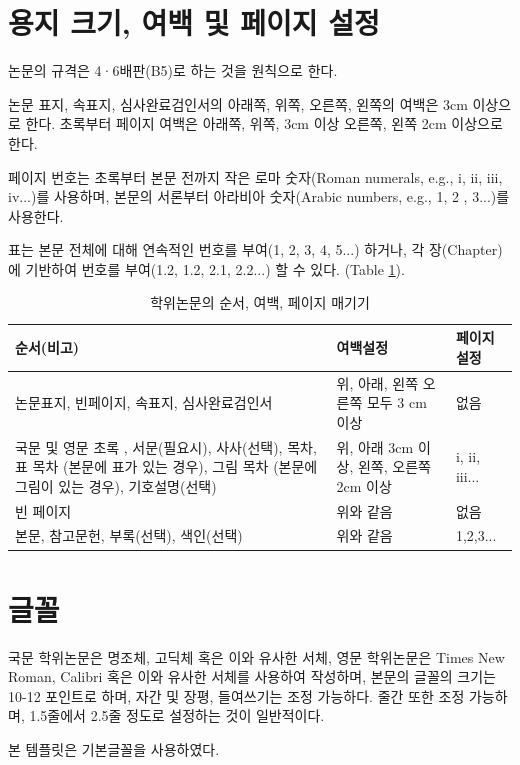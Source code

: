\documentclass[11pt]{report}
\numberwithin{figure}{chapter}
\begin{document}
\section{용지 크기, 여백 및 페이지 설정} \label{sec:papersize}
논문의 규격은 4·6배판(B5)로 하는 것을 원칙으로 한다.

논문 표지, 속표지, 심사완료검인서의 아래쪽, 위쪽, 오른쪽, 왼쪽의 여백은 3cm 이상으로 한다. 초록부터 페이지 여백은 아래쪽, 위쪽, 3cm 이상 오른쪽, 왼쪽 2cm 이상으로 한다.

페이지 번호는 초록부터 본문 전까지 작은 로마 숫자(Roman numerals, e.g., i, ii, iii, iv...)를 사용하며, 본문의 서론부터 아라비아 숫자(Arabic numbers, e.g., 1, 2 , 3...)를 사용한다.

표는 본문 전체에 대해 연속적인 번호를 부여(1, 2, 3, 4, 5...) 하거나, 각 장(Chapter)에 기반하여 번호를 부여(1.2, 1.2, 2.1, 2.2...) 할 수 있다. (Table \ref{tab:Organizing and formatting}).

\renewcommand\tablename{표}
\begin{table}
\caption{학위논문의 순서, 여백, 페이지 매기기}
\label{tab:Organizing and formatting}
\vspace{0.5cm}
\begin{tabular}{ m{7cm} m{3cm} m{2cm}}
\hline
순서(비고) & 여백설정& 페이지설정\\\hline
논문표지, 빈페이지, 속표지, 심사완료검인서  &	 위, 아래, 왼쪽 오른쪽 모두 3 cm 이상	&	없음\\\hline
국문 및 영문 초록 , 서문(필요시), 사사(선택), 목차, 표 목차 (본문에 표가 있는 경우), 그림 목차 (본문에 그림이 있는 경우), 기호설명(선택)	& 위, 아래 3cm 이상, 왼쪽, 오른쪽 2cm 이상  &  i, ii, iii...         \\\hline		
빈 페이지 & 위와 같음 & 없음\\\hline
본문, 참고문헌, 부록(선택), 색인(선택) & 위와 같음 & 1,2,3...	\\\hline

\end{tabular}
\end{table}

\section{글꼴} \label{sec:font}
국문 학위논문은 명조체, 고딕체 혹은 이와 유사한 서체, 영문 학위논문은 Times New Roman, Calibri 혹은 이와 유사한 서체를 사용하여 작성하며, 본문의 글꼴의 크기는 10-12 포인트로 하며, 자간 및 장평, 들여쓰기는 조정 가능하다. 줄간 또한 조정 가능하며, 1.5줄에서 2.5줄 정도로 설정하는 것이 일반적이다. \par 
본 템플릿은 기본글꼴을 사용하였다.\par 
\end{document}
